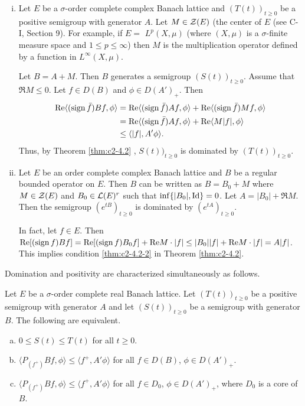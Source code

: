 \begin{example}\label{ex:c2-4.4}
\begin{enumerate}[(i)]
\item \label{ex:c2-4.4-1}
Let $E$ be a $\sigma$-order complete complex Banach lattice and $(T(t))_{t \geq 0}$ be a positive semigroup with generator $A$. 
Let $M \in \mathcal{Z}(E)$ (the center of $E$ (see C-I, Section 9). 
For example, if $E =$ $L^{p}(X,\mu)$ (where $(X,\mu)$ is a $\sigma$-finite measure space and $1 \leq p \leq \infty$) then $M$ is the multiplication operator defined by a function in $L^{\infty}(X,\mu)$.

Let $B = A + M$. Then $B$ generates a semigroup $(S(t))_{t \geq 0}$.
Assume that $\Re M \leq 0$. Let $f \in D(B)$ and $\phi \in D(A')_{+}$. Then
\begin{align*}
\mathop{}\!\mathrm{Re}\langle(\operatorname{sign}  \bar{f})Bf,\phi\rangle &= \mathop{}\!\mathrm{Re}\langle(\operatorname{sign}  \bar{f})Af,\phi\rangle + \mathop{}\!\mathrm{Re}\langle(\operatorname{sign}  \bar{f})Mf,\phi\rangle\\
&= \mathop{}\!\mathrm{Re}\langle(\operatorname{sign}  \bar{f})Af,\phi\rangle + \mathop{}\!\mathrm{Re}\langle M|f|,\phi\rangle\\
&\leq \langle|f|,A'\phi\rangle.
\end{align*}
Thus, by Theorem \ref{thm:c2-4.2}  , $S(t))_{t \geq 0}$ is dominated by $(T(t))_{t \geq 0}$.
\item \label{ex:c2-4.4-2}
Let $E$ be an order complete complex Banach lattice and $B$ be a regular bounded operator on $E$. 
Then $B$ can be written as $B = B_{0} + M$ where $M \in \mathcal{Z}(E)$ and $B_{0} \in \mathcal{L}(E)^{r}$ such that $\inf \{|B_{0}|, \operatorname{Id}\} = 0$.
Let $A = |B_{0}| + \Re  M$. 
Then the semigroup $(e^{tB})_{t \geq 0}$ is dominated by $(e^{tA})_{t \geq 0}$.

In fact, let $f \in E$. Then $\mathop{}\!\mathrm{Re}[(\operatorname{sign}  f)Bf] = \mathop{}\!\mathrm{Re}[(\operatorname{sign} f)B_{0}f] + \mathop{}\!\mathrm{Re} M \cdot |f| \leq |B_{0}||f| + \mathop{}\!\mathrm{Re} M \cdot |f| = A|f|$. 
This implies condition \ref{thm:c2-4.2-2} in Theorem \ref{thm:c2-4.2}.
\end{enumerate}
\end{example}

Domination and positivity are characterized simultaneously as
follows.

\begin{proposition}\label{prop:c2-4.5}
Let $E$ be a $\sigma$-order complete real Banach lattice.
Let $(T(t))_{t \geq 0}$ be a positive semigroup with generator $A$ and let
$(S(t))_{t \geq 0}$ be a semigroup with generator $B$. The following are equivalent.
\begin{enumerate}[(a)]
\item \label{prop:c2-4.5-1}
$0 \leq S(t) \leq T(t)$ for all $t \geq 0$.
\item \label{prop:c2-4.5-2}
$\langle P_{(f^{+})}Bf,\phi\rangle \leq \langle f^{+},A'\phi\rangle$ for all $f \in D(B)$, $\phi \in D(A')_{+}$.
\item \label{prop:c2-4.5-3}
$\langle P_{(f^{+})}Bf,\phi\rangle \leq \langle f^{+},A'\phi\rangle$ for all $f \in D_{0}$, $\phi \in D(A')_{+}$,
where $D_{0}$ is a core of $B$.
\end{enumerate}
\end{proposition}

